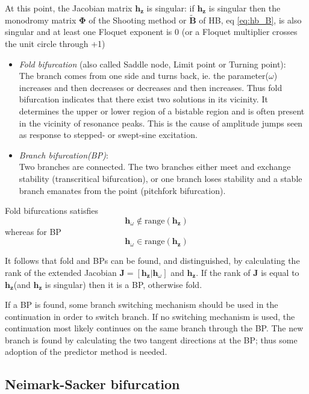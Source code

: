 At this point, the Jacobian matrix $\bm h_{\bm z}$ is singular: if $\bm h_{\bm
  z}$ is singular then the monodromy matrix $\bm \Phi$ of the Shooting method or
$\tilde{\bm B}$ of HB, eq \eqref{eq:hb_B}, is also singular and at least one
Floquet exponent is 0 (or a Floquet multiplier crosses the unit circle through
+1)


\begin{itemize}
\item \textit{Fold bifurcation} (also called Saddle node, Limit point or Turning
  point):\\
  The branch comes from one side and turns back, ie. the parameter($\omega$)
  increases and then decreases or decreases and then increases. Thus fold
  bifurcation indicates that there exist two solutions in its vicinity.
  It determines the upper or lower region of a bistable region and is often
  present in the vicinity of resonance peaks. This is the cause of amplitude
  jumps seen as response to stepped- or swept-sine excitation.
\item \textit{Branch bifurcation(BP)}: \\
  Two branches are connected. The two branches either meet and exchange
  stability (transcritical bifurcation), or one branch loses stability and a
  stable branch emanates from the point (pitchfork bifurcation).
\end{itemize}

Fold bifurcations satisfies
\begin{equation}
  \bm h_\omega \notin \text{range} (\bm h_{\bm z})
\end{equation}
whereas for BP
\begin{equation}
  \bm h_\omega \in \text{range} (\bm h_{\bm z})
\end{equation}

It follows that fold and BPs can be found, and distinguished, by
calculating the rank of the extended Jacobian $\bm J = [\bm h_{\bm z}| \bm
h_\omega]$ and $\bm h_{\bm z}$. If the rank of $\bm J$ is equal to $\bm h_{\bm
  z}$(and $\bm h_{\bm z}$ is singular) then it is a BP, otherwise fold.

If a BP is found, some branch switching mechanism should be used in the
continuation in order to switch branch. If no switching mechanism is used, the
continuation most likely continues on the same branch through the BP. The
new branch is found by calculating the two tangent directions at the BP;
thus some adoption of the predictor method is needed.


\subsection{Neimark-Sacker bifurcation}
\label{sec:ns_bif}

